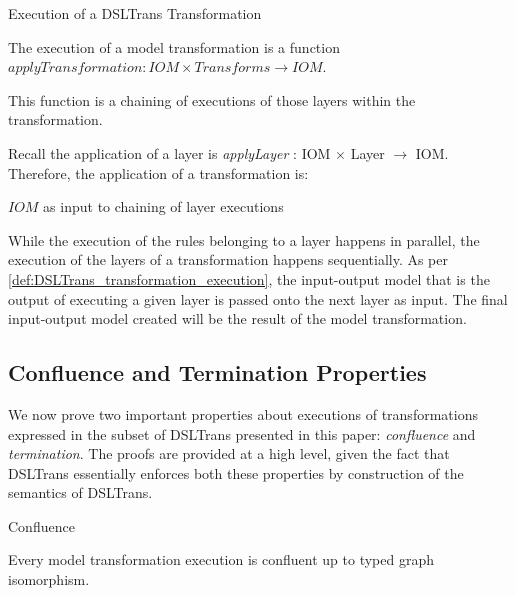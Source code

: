 \begin{definition} {Execution of a DSLTrans Transformation\\}
\label{def:DSLTrans_transformation_execution} 

The execution of a model transformation is a function $\mathit{applyTransformation}: \mathit{IOM} \times \mathit{Transforms} \rightarrow \mathit{IOM}$.

This function is a chaining of executions of those layers within the transformation.

Recall the application of a layer is \textit{applyLayer} : IOM $\times$ Layer $\rightarrow$ IOM. Therefore, the application of a transformation is:

$\mathit{IOM}$ as input to chaining of layer executions 


\end{definition}


While the execution of the rules belonging to a layer happens in parallel, the execution of the layers of a transformation happens sequentially. As per \cref{def:DSLTrans_transformation_execution}, the input-output model that is the output of executing a given layer is passed onto the next layer as input. The final input-output model created will be the result of the model transformation.



\subsection{Confluence and Termination Properties}

We now prove two important properties about executions of transformations expressed in the subset of DSLTrans presented in this paper: \emph{confluence} and \emph{termination}. The proofs are provided at a high level, given the fact that DSLTrans essentially enforces both these properties by construction of the semantics of DSLTrans.

\begin{proposition}{Confluence}

Every model transformation execution is confluent up to typed graph isomorphism.



\end{proposition}

